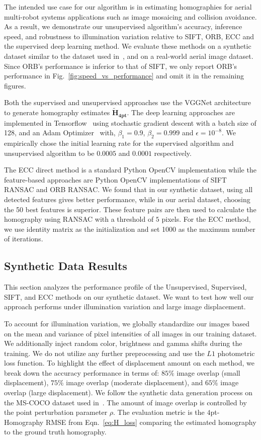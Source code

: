 \documentclass[letterpaper, 10 pt, conference]{ieeeconf}
\begin{document}
The intended use case for our algorithm is in estimating homographies for aerial multi-robot systems applications such as image mosaicing and collision avoidance. As a result, we demonstrate our unsupervised algorithm's accuracy, inference speed, and robustness to illumination variation relative to SIFT, ORB, ECC and the supervised deep learning method. We evaluate these methods on a synthetic dataset similar to the dataset used in~\cite{detone2016}, and on a real-world aerial image dataset. Since ORB's performance is inferior to that of SIFT, we only report ORB's performance in Fig.~\ref{fig:speed_vs_performance} and omit it in the remaining figures. 

Both the supervised and unsupervised approaches use the VGGNet architecture to generate homography estimates $\mathbf{\tilde{H}_{4pt}}$. The deep learning approaches are implemented in Tensorflow~\cite{abadi2016tensorflow} using stochastic gradient descent with a batch size of 128, and an Adam Optimizer~\cite{kingma2014adam} with, $\beta_1 = 0.9$, $\beta_2 = 0.999$ and $\epsilon = 10^{-8}$. We empirically chose the initial learning rate for the supervised algorithm and unsupervised algorithm to be $0.0005$ and $0.0001$ respectively.

The ECC direct method is a standard Python OpenCV implementation while the feature-based approaches are Python OpenCV implementations of SIFT RANSAC and ORB RANSAC. We found that in our synthetic dataset, using all detected features gives better performance, while in our aerial dataset, choosing the 50 best features is superior. These feature pairs are then used to calculate the homography using RANSAC with a threshold of $5$ pixels. For the ECC method, we use identity matrix as the initialization and set 1000 as the maximum number of iterations. 

\subsection{Synthetic Data Results}
This section analyzes the performance profile of the Unsupervised, Supervised, SIFT, and ECC methods on our synthetic dataset. We want to test how well our approach performs under illumination variation and large image displacement.

To account for illumination variation, we globally standardize our images based on the mean and variance of pixel intensities of all images in our training dataset. We additionally inject random color, brightness and gamma shifts during the training. We do not utilize any further preprocessing and use the $L1$ photometric loss function. To highlight the effect of displacement amount on each method, we break down the accuracy performance in terms of: $85\%$ image overlap (small displacement), $75\%$ image overlap (moderate displacement), and $65\%$ image overlap (large displacement). We follow the synthetic data generation process on the MS-COCO dataset used in~\cite{detone2016}. The amount of image overlap is controlled by the point perturbation parameter $\rho$. The evaluation metric is the $4$pt-Homography RMSE from Eqn.~\eqref{eq:H_loss} comparing the estimated homography to the ground truth homography. 
\end{document}

